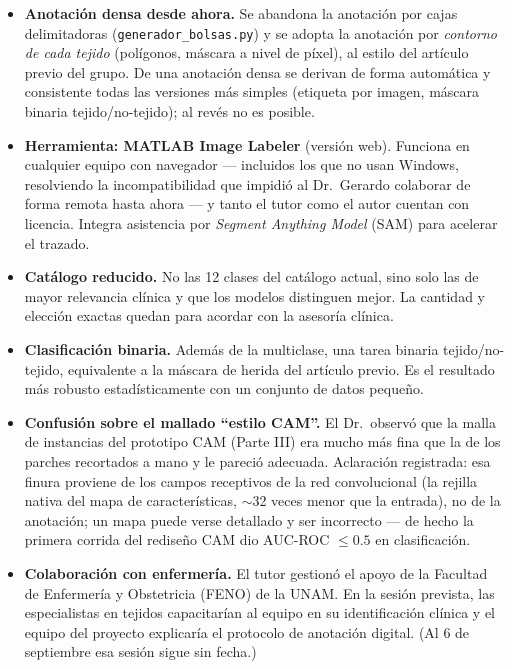 \documentclass[12pt,letterpaper]{report}
\begin{document}
\begin{itemize}[leftmargin=1.5em]
    \item \textbf{Anotación densa desde ahora.} Se abandona la anotación por cajas delimitadoras
        (\texttt{generador\_bolsas.py}) y se adopta la anotación por \emph{contorno de cada tejido}
        (polígonos, máscara a nivel de píxel), al estilo del artículo previo del grupo. De una
        anotación densa se derivan de forma automática y consistente todas las versiones más simples
        (etiqueta por imagen, máscara binaria tejido/no-tejido); al revés no es posible.
    \item \textbf{Herramienta: MATLAB Image Labeler} (versión web). Funciona en cualquier equipo con
        navegador --- incluidos los que no usan Windows, resolviendo la incompatibilidad que impidió
        al Dr.\ Gerardo colaborar de forma remota hasta ahora --- y tanto el tutor como el autor
        cuentan con licencia. Integra asistencia por \emph{Segment Anything Model} (SAM) para
        acelerar el trazado.
    \item \textbf{Catálogo reducido.} No las 12 clases del catálogo actual, sino solo las de mayor
        relevancia clínica y que los modelos distinguen mejor. La cantidad y elección exactas quedan
        para acordar con la asesoría clínica.
    \item \textbf{Clasificación binaria.} Además de la multiclase, una tarea binaria tejido/no-tejido,
        equivalente a la máscara de herida del artículo previo. Es el resultado más robusto
        estadísticamente con un conjunto de datos pequeño.
    \item \textbf{Confusión sobre el mallado ``estilo CAM''.} El Dr.\ observó que la malla de
        instancias del prototipo CAM (Parte III) era mucho más fina que la de los parches recortados
        a mano y le pareció adecuada. Aclaración registrada: esa finura proviene de los campos
        receptivos de la red convolucional (la rejilla nativa del mapa de características, $\sim$32
        veces menor que la entrada), no de la anotación; un mapa puede verse detallado y ser
        incorrecto --- de hecho la primera corrida del rediseño CAM dio AUC-ROC $\leq 0.5$ en
        clasificación.
    \item \textbf{Colaboración con enfermería.} El tutor gestionó el apoyo de la Facultad de
        Enfermería y Obstetricia (FENO) de la UNAM. En la sesión prevista, las especialistas en
        tejidos capacitarían al equipo en su identificación clínica y el equipo del proyecto
        explicaría el protocolo de anotación digital. (Al 6 de septiembre esa sesión sigue sin fecha.)
\end{itemize}
\end{document}
